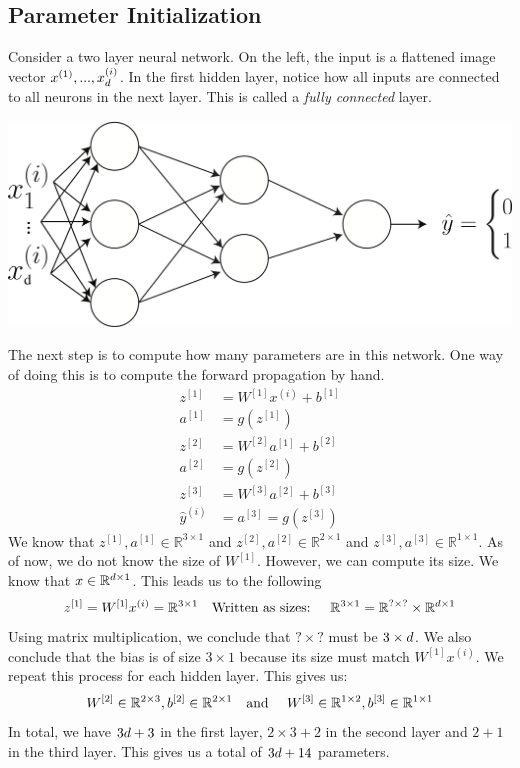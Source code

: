\documentclass{article}
\numberwithin{equation}{section}
\begin{document}
\subsection{Parameter Initialization}

Consider a two layer neural network. On the left, the input is a flattened image vector $x^{(1)}, ..., x^{(i)}_{{d}}$. In the first hidden layer, notice how all inputs are connected to all neurons in the next layer. This is called a \textit{fully connected} layer.
\begin{center}
\includegraphics[width=0.80\linewidth]{two_layer_d}\\
\end{center}
The next step is to compute how many parameters are in this network. One way of doing this is to compute the forward propagation by hand.
\begin{align}
z^{[1]} &= W^{[1]} x^{(i)} + b^{[1]} \\
a^{[1]} &= g(z^{[1]}) \\
z^{[2]} &= W^{[2]} a^{[1]} + b^{[2]} \\
a^{[2]} &= g(z^{[2]}) \\ \label{eq:a2}
z^{[3]} &= W^{[3]} a^{[2]} + b^{[3]} \\ \label{eq:z3}
\hat{y}^{(i)} &= a^{[3]} = g(z^{[3]})
\end{align}
We know that $z^{[1]}, a^{[1]}\in \mathbb{R}^{3\times 1} $ and $z^{[2]}, a^{[2]}\in \mathbb{R}^{2\times 1} $  and  $z^{[3]}, a^{[3]}\in \mathbb{R}^{1 \times 1} $.
As of now, we do not know the size of $W^{[1]}$.
However, we can compute its size. We know that $x \in \mathbb{R}^{{d} \times 1}$.
This leads us to the following
\begin{equation}
z^{[1]} = W^{[1]} x^{(i)} = \mathbb{R}^{3 \times 1} \textrm{\quad Written as sizes: \quad} \mathbb{R}^{3 \times 1} = \mathbb{R}^{? \times ?} \times  \mathbb{R}^{{d} \times 1}
\end{equation}
Using matrix multiplication, we conclude that $? \times ?$ must be $3 \times {d}$. We also conclude that the bias is of size $3 \times 1$ because its size must match $W^{[1]} x^{(i)}$. 
We repeat this process for each hidden layer.
This gives us:
\begin{equation}
W^{[2]} \in \mathbb{R}^{2 \times 3}, b^{[2]} \in \mathbb{R}^{2 \times 1} \textrm{\quad and \quad} W^{[3]} \in \mathbb{R}^{1 \times 2}, b^{[3]} \in \mathbb{R}^{1 \times 1}
\end{equation}
In total, we have $3{d}+3$ in the first layer, $2\times3 + 2$ in the second layer and $2 + 1$ in the third layer. This gives us a total of $3{d} + 14$ parameters.
\end{document}
